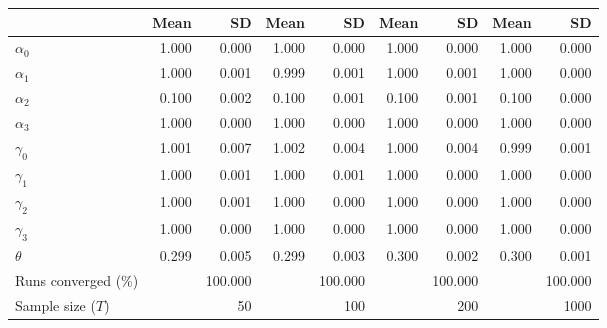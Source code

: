 
\begin{tabular}[t]{lrrrrrrrr}
\toprule
  & Mean & SD & Mean  & SD  & Mean   & SD   & Mean    & SD   \\
\midrule
$\alpha_{0}$ & 1.000 & 0.000 & 1.000 & 0.000 & 1.000 & 0.000 & 1.000 & 0.000\\
$\alpha_{1}$ & 1.000 & 0.001 & 0.999 & 0.001 & 1.000 & 0.001 & 1.000 & 0.000\\
$\alpha_{2}$ & 0.100 & 0.002 & 0.100 & 0.001 & 0.100 & 0.001 & 0.100 & 0.000\\
$\alpha_{3}$ & 1.000 & 0.000 & 1.000 & 0.000 & 1.000 & 0.000 & 1.000 & 0.000\\
$\gamma_{0}$ & 1.001 & 0.007 & 1.002 & 0.004 & 1.000 & 0.004 & 0.999 & 0.001\\
$\gamma_{1}$ & 1.000 & 0.001 & 1.000 & 0.001 & 1.000 & 0.000 & 1.000 & 0.000\\
$\gamma_{2}$ & 1.000 & 0.001 & 1.000 & 0.000 & 1.000 & 0.000 & 1.000 & 0.000\\
$\gamma_{3}$ & 1.000 & 0.000 & 1.000 & 0.000 & 1.000 & 0.000 & 1.000 & 0.000\\
$\theta$ & 0.299 & 0.005 & 0.299 & 0.003 & 0.300 & 0.002 & 0.300 & 0.001\\
Runs converged (\%) &  & 100.000 &  & 100.000 &  & 100.000 &  & 100.000\\
Sample size ($T$) &  & 50 &  & 100 &  & 200 &  & 1000\\
\bottomrule
\end{tabular}
